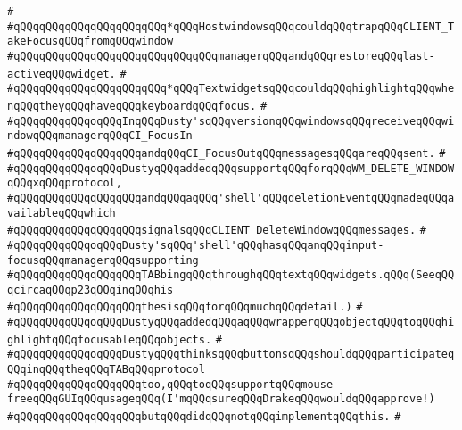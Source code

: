 \verb|#|\newline
\verb|#qQQqqQQqqQQqqQQqqQQqqQQq*qQQqHostwindowsqQQqcouldqQQqtrapqQQqCLIENT_TakeFocusqQQqfromqQQqwindow|\newline
\verb|#qQQqqQQqqQQqqQQqqQQqqQQqqQQqqQQqmanagerqQQqandqQQqrestoreqQQqlast-activeqQQqwidget.|\newline
\verb|#|\newline
\verb|#qQQqqQQqqQQqqQQqqQQqqQQq*qQQqTextwidgetsqQQqcouldqQQqhighlightqQQqwhenqQQqtheyqQQqhaveqQQqkeyboardqQQqfocus.|\newline
\verb|#|\newline
\verb|#qQQqqQQqqQQqoqQQqInqQQqDusty'sqQQqversionqQQqwindowsqQQqreceiveqQQqwindowqQQqmanagerqQQqCI_FocusIn|\newline
\verb|#qQQqqQQqqQQqqQQqqQQqandqQQqCI_FocusOutqQQqmessagesqQQqareqQQqsent.|\newline
\verb|#|\newline
\verb|#qQQqqQQqqQQqoqQQqDustyqQQqaddedqQQqsupportqQQqforqQQqWM_DELETE_WINDOWqQQqxqQQqprotocol,|\newline
\verb|#qQQqqQQqqQQqqQQqqQQqandqQQqaqQQq'shell'qQQqdeletionEventqQQqmadeqQQqavailableqQQqwhich|\newline
\verb|#qQQqqQQqqQQqqQQqqQQqsignalsqQQqCLIENT_DeleteWindowqQQqmessages.|\newline
\verb|#|\newline
\verb|#qQQqqQQqqQQqoqQQqDusty'sqQQq'shell'qQQqhasqQQqanqQQqinput-focusqQQqmanagerqQQqsupporting|\newline
\verb|#qQQqqQQqqQQqqQQqqQQqTABbingqQQqthroughqQQqtextqQQqwidgets.qQQq(SeeqQQqcircaqQQqp23qQQqinqQQqhis|\newline
\verb|#qQQqqQQqqQQqqQQqqQQqthesisqQQqforqQQqmuchqQQqdetail.)|\newline
\verb|#|\newline
\verb|#qQQqqQQqqQQqoqQQqDustyqQQqaddedqQQqaqQQqwrapperqQQqobjectqQQqtoqQQqhighlightqQQqfocusableqQQqobjects.|\newline
\verb|#|\newline
\verb|#qQQqqQQqqQQqoqQQqDustyqQQqthinksqQQqbuttonsqQQqshouldqQQqparticipateqQQqinqQQqtheqQQqTABqQQqprotocol|\newline
\verb|#qQQqqQQqqQQqqQQqqQQqtoo,qQQqtoqQQqsupportqQQqmouse-freeqQQqGUIqQQqusageqQQq(I'mqQQqsureqQQqDrakeqQQqwouldqQQqapprove!)|\newline
\verb|#qQQqqQQqqQQqqQQqqQQqbutqQQqdidqQQqnotqQQqimplementqQQqthis.|\newline
\verb|#|\newline
